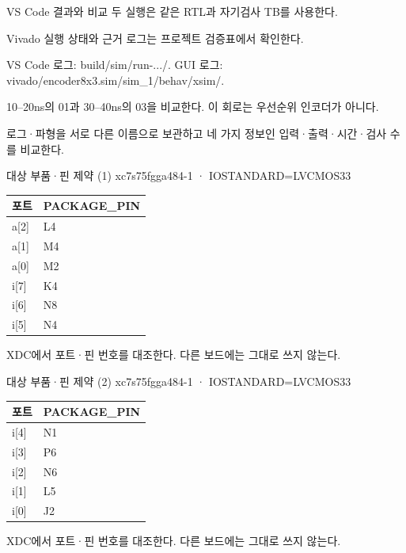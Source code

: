 \begin{frame}{VS Code 결과와 비교}\relax
\small
두 실행은 같은 RTL과 자기검사 TB를 사용한다.\par\vspace{0.22cm}Vivado 실행 상태와 근거 로그는 프로젝트 검증표에서 확인한다.\par\vspace{0.22cm}VS Code 로그: build/sim/run-.../. GUI 로그: vivado/encoder8x3.sim/sim\_1/behav/xsim/.\par\vspace{0.22cm}10–20ns의 01과 30–40ns의 03을 비교한다. 이 회로는 우선순위 인코더가 아니다.\par\vspace{0.22cm}로그·파형을 서로 다른 이름으로 보관하고 네 가지 정보인 입력·출력·시간·검사 수를 비교한다.\par
\end{frame}

\begin{frame}{대상 부품·핀 제약 (1)}\relax
\small
xc7s75fgga484-1 · IOSTANDARD=LVCMOS33\par\begin{center}\renewcommand{\arraystretch}{1.45}
\begin{tabular}{l|l}
포트 & PACKAGE\_PIN\\\hline
a[2] & L4\\
a[1] & M4\\
a[0] & M2\\
i[7] & K4\\
i[6] & N8\\
i[5] & N4\\
\end{tabular}\end{center}
XDC에서 포트·핀 번호를 대조한다. 다른 보드에는 그대로 쓰지 않는다.\par
\end{frame}

\begin{frame}{대상 부품·핀 제약 (2)}\relax
\small
xc7s75fgga484-1 · IOSTANDARD=LVCMOS33\par\begin{center}\renewcommand{\arraystretch}{1.45}
\begin{tabular}{l|l}
포트 & PACKAGE\_PIN\\\hline
i[4] & N1\\
i[3] & P6\\
i[2] & N6\\
i[1] & L5\\
i[0] & J2\\
\end{tabular}\end{center}
XDC에서 포트·핀 번호를 대조한다. 다른 보드에는 그대로 쓰지 않는다.\par
\end{frame}

